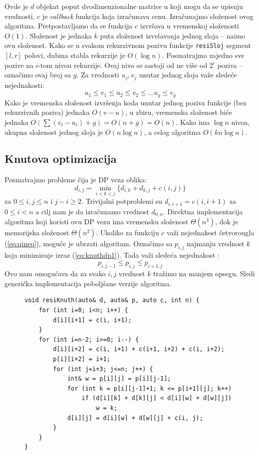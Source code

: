 \documentclass[a4paper,12pt]{article}
\numberwithin{equation}{subsection}
\begin{document}
Ovde je $d$ objekat poput dvodimenzionalne matrice u koji mogu da se upisuju vrednosti, $c$ je \textit{callback} funkcija koja izra\v cunava cenu. Izra\v cunajmo slo\v zenost ovog algoritma. Pretpostavljamo da se funkcija $c$ izvr\v sava u vremenskoj slo\v zenosti $O(1)$. Slo\v zenost je jednaka $k$ puta slo\v zenost izvr\v savanja jednog sloja -- na\dj imo ovu slo\v zenost. Kako se u svakom rekurzivnom pozivu funkcije \texttt{resiSloj} segment $[l, r]$ polovi, dubina stabla rekurzije je $O(\log n)$. Posmatrajmo zajedno sve pozive na $i$-tom nivou rekurzije. Ovaj nivo se sastoji od ne vi\v se od $2^i$ poziva -- ozna\v cimo ovaj broj sa $g$. Za vrednosti $u_j, v_j$ unutar jednog sloja va\v ze slede\' ce nejednakosti:
$$
	u_1 \leq v_1 \leq u_2 \leq v_2 \leq \ldots u_g \leq v_g
$$
Kako je vremenska slo\v zenost izvr\v senja koda unutar jednog poziva funkcije (bez rekurzivnih poziva) jednaka $O(v-u)$, u zbiru, vremenska slo\v zenost bi\' ce jednaka $O(\sum(v_i-u_i) + g) = O(n + g) = O(n)$. Kako ima $\log n$ nivoa, ukupna slo\v zenost jednog sloja je $O(n \log n)$, a celog algoritma $O(kn\log n)$.

\subsection{Knutova optimizacija}

Posmatrajmo probleme \v cija je DP veza oblika:
\begin{equation} \label{eq:knuthdp1}
	d_{i, j} = \min_{i < k < j} \{ d_{i, k} + d_{k, j} + c(i, j) \}
\end{equation}
za $0 \leq i, j \leq n$ i $j-i \geq 2$. Trivijalni potproblemi su $d_{i,i+1} = c(i, i+1)$ za $0 \leq i < n$ a cilj nam je da izra\v cunamo vrednost $d_{0, n}$. Direktna implementacija algoritma koji koristi ovu DP vezu ima vremensku slo\v zenost $\Theta(n^3)$, dok je memorijska slo\v zenost $\Theta(n^2)$. Ukoliko za funkciju $c$ va\v zi nejednakost \v cetvorougla (\ref{eq:qineq}), mogu\' ce je ubrzati algoritam. Ozna\v cimo sa $p_{i,j}$ najmanju vrednost $k$ koja minimizuje izraz (\ref{eq:knuthdp1}). Tada va\v zi slede\' ca nejednakost \cite{knuthquad}:
\begin{equation} \label{eq:knuthineq}
	p_{i,j-1} \leq p_{i, j} \leq p_{i+1, j}
\end{equation}
Ovo nam omogu\' cava da za svako $i,j$ vrednost $k$ tra\v zimo na  manjem opsegu. Sledi generi\v cka implementacija pobolj\v sane verzije algoritma.
\\

\begin{figure}[H]
\begin{verbatim}
void resiKnuth(auto& d, auto& p, auto c, int n) {
    for (int i=0; i<n; i++) {
        d[i][i+1] = c(i, i+1);
    }
    for (int i=n-2; i>=0; i--) {
        d[i][i+2] = c(i, i+1) + c(i+1, i+2) + c(i, i+2);
        p[i][i+2] = i+1;
        for (int j=i+3; j<=n; j++) {
            int& w = p[i][j] = p[i][j-1];
            for (int k = p[i][j-1]+1; k <= p[i+1][j]; k++)
                if (d[i][k] + d[k][j] < d[i][w] + d[w][j])
                    w = k;
            d[i][j] = d[i][w] + d[w][j] + c(i, j);
        }
    }
}
\end{verbatim}
\end{figure}
\end{document}
